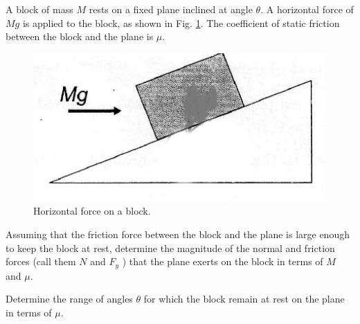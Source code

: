 \begin{problem}
    A block of mass $M$ rests on a fixed plane inclined at angle $\theta$. A horizontal force of $Mg$ is applied to the block, as shown in Fig. \ref{2010q2}. The coefficient of static friction between the block and the plane is $\mu$.
    \begin{figure}[h]
        \centering
        \includegraphics[width=0.5 \linewidth]{spho_book_TYS_images/2010q2.png}
        \caption{Horizontal force on a block.} \label{2010q2}
    \end{figure}
    \begin{subproblem}
        Assuming that the friction force between the block and the plane is large enough to keep the block at rest, determine the magnitude of the normal and friction forces (call them $N$ and $F_y$ ) that the plane exerts on the block in terms of $M$ and $\mu$.
    \end{subproblem}

    \begin{subproblem}
        Determine the range of angles $\theta$ for which the block remain at rest on the plane in terms of $\mu$. 
    \end{subproblem}
\end{problem}


